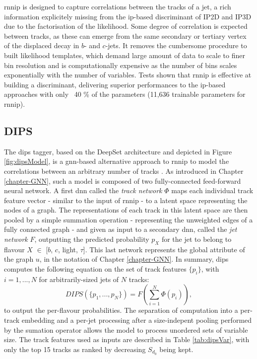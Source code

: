 \gls{rnnip} is designed to capture correlations between the tracks of a jet, a rich information explicitely missing from the \gls{ip}-based discriminant of IP2D and IP3D due to the factorisation of the likelihood. Some degree of correlation is expected between tracks, as these can emerge from the same secondary or tertiary vertex of the displaced decay in $b$- and $c$-jets. It removes the cumbersome procedure to built likelihood templates, which demand large amount of data to scale to finer bin resolution and is computationally expensive as the number of bins scales exponentially with the number of variables. Tests shown that \gls{rnnip} is effective at building a discriminant, delivering superior performances to the \gls{ip}-based approaches with only ~40 \% of the parameters (11,636 trainable parameters for \gls{rnnip})\cite{Paganini:2289214}.

\subsection{DIPS}
The \gls{dips} tagger, based on the DeepSet architecture \cite{NIPS2017f22e4747} and depicted in Figure \ref{fig:dipsModel}, is a \gls{gnn}-based alternative approach to \gls{rnnip} to model the correlations between an arbitrary number of tracks \cite{ATL-PHYS-PUB-2020-014}. As introduced in Chapter \ref{chapter-GNN}, such a model is composed of two fully-connected feed-forward neural network. A first \gls{dnn} called the \textit{track network} $\Phi$ maps each individual track feature vector - similar to the input of \gls{rnnip} - to a latent space representing the nodes of a graph. The representations of each track in this latent space are then pooled by a simple summation operation - representing the unweighted edges of a fully connected graph - and given as input to a secondary \gls{dnn}, called the \textit{jet network} $F$, outputting the predicted probability $p_X$ for the jet to belong to flavour $X$ $\in$ [$b$, $c$, light, $\tau$]. This last network represents the global attribute of the graph $u$, in the notation of Chapter \ref{chapter-GNN}. 
In summary, \gls{dips} computes the following equation on the set of track features $\{ p_i \}$, with $i = 1, ..., N$ for arbitrarily-sized jets of $N$ tracks:
\begin{equation}
  DIPS( \{p_1, ..., p_N \} ) = F\left( \sum_{i=1}^N \Phi(p_i) \right),
\end{equation}
to output the per-flavour probabilities. The separation of computation into a per-track embedding and a per-jet processing after a size-indepent pooling performed by the sumation operator allows the model to process unordered sets of variable size. The track features used as inputs are described in Table \ref{tab:dipsVar}, with only the top 15 tracks as ranked by decreasing $S_{d_0}$ being kept.

